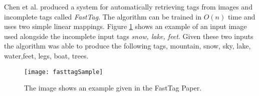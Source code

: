     Chen et al. \cite{Chen2013} produced a system for automatically
    retrieving tags from images and incomplete tags called
    \emph{FastTag}. The algorithm can be trained in \(O(n)\) time and
    uses two simple linear mappings. Figure \ref{fasttag} shows an
    example of an input image used alongside the incomplete input tags
    \emph{snow, lake, feet}. Given these two inputs the algorithm was
    able to produce the following tags, {mountain, snow, sky, lake, water,feet, legs,
    boat, trees}.
    \begin{figure}[H]
        \caption{The image shows an example given in the FastTag
        Paper.\cite{Chen2013}}
        \centering
        \texttt{[image: fasttagSample]}
        \label{fasttag}
    \end{figure}
